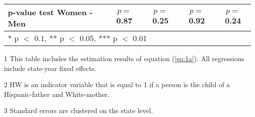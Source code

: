 \begin{table}[H]
\begin{threeparttable}
\begin{tabular}[t]{lcccc}
p-value test Women - Men & $p=$0.87 & $p=$0.25 & $p=$0.92 & $p=$0.24\\
\bottomrule
\multicolumn{5}{l}{\rule{0pt}{1em}* p $<$ 0.1, ** p $<$ 0.05, *** p $<$ 0.01}\\
\end{tabular}
\begin{tablenotes}
\item[1] {\footnotesize{This table includes the estimation results of equation (\ref{eq:1a}). All regressions include state-year fixed effects.}}
\item[2] {\footnotesize{HW is an indicator variable that is equal to 1 if a person is the child of a Hispanic-father and White-mother.}}
\item[3] {\footnotesize{Standard errors are clustered on the state level.}}
\end{tablenotes}
\end{threeparttable}
\end{table}
